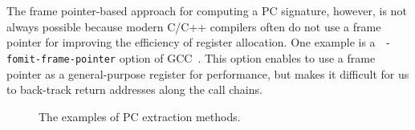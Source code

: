 
The frame pointer-based approach for computing a PC signature, however, is not
always possible because modern C/C++ compilers often do not use a frame pointer
for improving the efficiency of register allocation.  One example is a {\tt
-fomit-frame-pointer} option of GCC~\cite{GCC}.  This option enables to use a frame
pointer as a general-purpose register for performance, but makes it difficult for us
to back-track return addresses along the call chains.  

\begin{figure}[t]
	\centering
	\caption{The examples of PC extraction methods.}
	\label{fig:getpc}
\end{figure}


